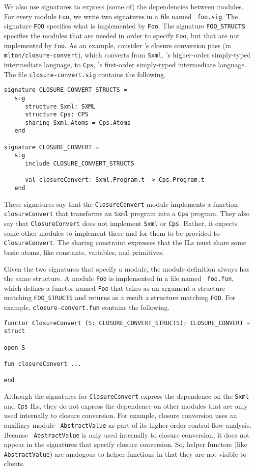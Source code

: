 \documentclass[12pt]{article}
\begin{document}
We also use signatures to express (some of) the dependencies between modules.
For every module {\tt Foo}, we write two signatures in a file named {\tt
foo.sig}.  The signature {\tt FOO} specifies what is implemented by {\tt Foo}.
The signature {\tt FOO\_STRUCTS} specifies the modules that are needed in order
to specify {\tt Foo}, but that are not implemented by {\tt Foo}.  As an example,
consider {\mlton}'s closure conversion pass (in {\tt mlton/closure-convert}),
which converts from {\tt Sxml}, {\mlton}'s higher-order simply-typed
intermediate language, to {\tt Cps}, {\mlton}'s first-order simply-typed
intermediate language.  The file {\tt closure-convert.sig} contains the
following.
\begin{verbatim}
signature CLOSURE_CONVERT_STRUCTS = 
   sig
      structure Sxml: SXML
      structure Cps: CPS
      sharing Sxml.Atoms = Cps.Atoms
   end

signature CLOSURE_CONVERT = 
   sig
      include CLOSURE_CONVERT_STRUCTS

      val closureConvert: Sxml.Program.t -> Cps.Program.t
   end
\end{verbatim}
These signatures say that the {\tt ClosureConvert} module implements a function
{\tt closureConvert} that transforms an {\tt Sxml} program into a {\tt Cps}
program.  They also say that {\tt ClosureConvert} does not implement {\tt Sxml}
or {\tt Cps}.  Rather, it expects some other modules to implement these and for
them to be provided to {\tt ClosureConvert}.  The sharing constraint expresses
that the ILs must share some basic atoms, like constants, variables, and
primitives.

Given the two signatures that specify a module, the module definition always has
the same structure.  A module {\tt Foo} is implemented in a file named {\tt
foo.fun}, which defines a functor named {\tt Foo} that takes as an argument a
structure matching {\tt FOO\_STRUCTS} and returns as a result a structure
matching {\tt FOO}.  For example, {\tt closure-convert.fun} contains the
following.
\begin{verbatim}
functor ClosureConvert (S: CLOSURE_CONVERT_STRUCTS): CLOSURE_CONVERT = 
struct

open S

fun closureConvert ...

end
\end{verbatim}
Although the signatures for {\tt ClosureConvert} express the dependence
on the {\tt Sxml} and {\tt Cps} ILs, they do not express the
dependence on other modules that are only used internally to closure
conversion.  For example, closure conversion uses an auxiliary module {\tt
AbstractValue} as part of its higher-order control-flow analysis.  Because {\tt
AbstractValue} is only used internally to closure conversion, it does not appear
in the signatures that specify closure conversion.  So, helper functors (like
{\tt AbstractValue}) are analogous to helper functions in that they are not
visible to clients.
\end{document}
